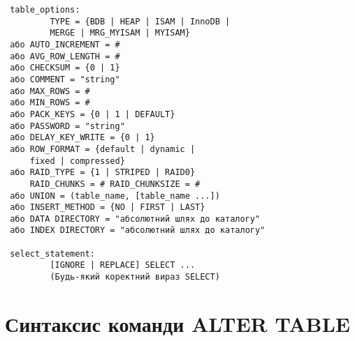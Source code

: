 \begin{verbatim}
 table_options:
         TYPE = {BDB | HEAP | ISAM | InnoDB | 
         MERGE | MRG_MYISAM | MYISAM}
 або AUTO_INCREMENT = #
 або AVG_ROW_LENGTH = #
 або CHECKSUM = {0 | 1}
 або COMMENT = "string"
 або MAX_ROWS = #
 або MIN_ROWS = #
 або PACK_KEYS = {0 | 1 | DEFAULT}
 або PASSWORD = "string"
 або DELAY_KEY_WRITE = {0 | 1}
 або ROW_FORMAT = {default | dynamic | 
     fixed | compressed}
 або RAID_TYPE = {1 | STRIPED | RAID0} 
     RAID_CHUNKS = # RAID_CHUNKSIZE = #
 або UNION = (table_name, [table_name ...])
 або INSERT_METHOD = {NO | FIRST | LAST}
 або DATA DIRECTORY = "абсолютний шлях до каталогу"
 або INDEX DIRECTORY = "абсолютний шлях до каталогу"

 select_statement:
         [IGNORE | REPLACE] SELECT ...  
         (Будь-який коректний вираз SELECT)

\end{verbatim}
\section{Синтаксис команди ALTER TABLE}
\label{alttab:text}
\begin{verbatim}

\end{verbatim}